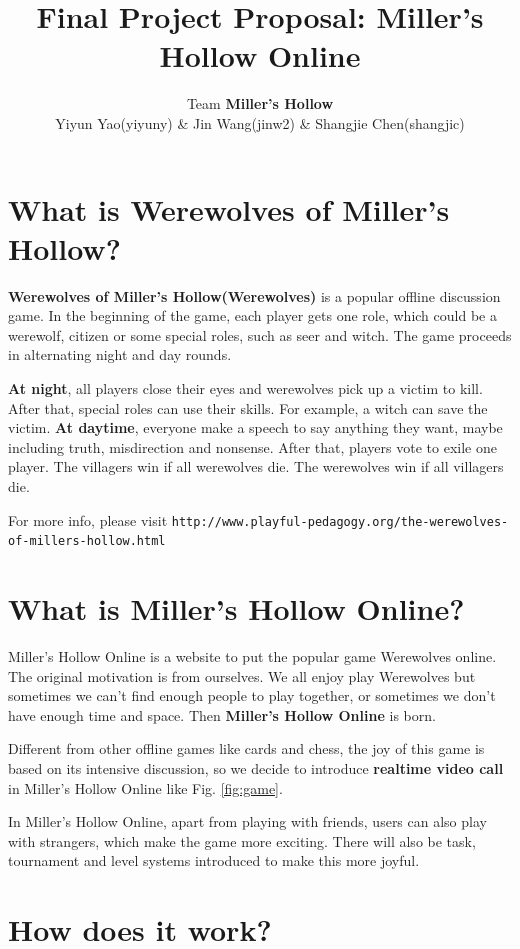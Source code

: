 \documentclass[11pt]{article}
\title{Final Project Proposal: Miller's Hollow Online}
\author{Team \textbf{Miller's Hollow}
\\Yiyun Yao(yiyuny) \& Jin Wang(jinw2) \& Shangjie Chen(shangjic)}
\date{}                                           %
\begin{document}
\maketitle
\section{What is Werewolves of Miller's Hollow?}
\textbf{Werewolves of Miller's Hollow(Werewolves)} is a popular offline discussion game. In the beginning of the game, each player gets one role, which could be a werewolf, citizen or some special roles, such as seer and witch. The game proceeds in alternating night and day rounds.

\textbf{At night}, all players close their eyes and werewolves pick up a victim to kill. After that, special roles can use their skills. For example, a witch can save the victim. \textbf{At daytime}, everyone make a speech to say anything they want, maybe including truth, misdirection and nonsense. After that, players vote to exile one player. The villagers win if all werewolves die. The werewolves win if all villagers die.

For more info, please visit \verb|http://www.playful-pedagogy.org/the-werewolves-of-millers-hollow.html|

\section{What is Miller's Hollow Online?}
Miller's Hollow Online is a website to put the popular game Werewolves online. The original motivation is from ourselves. We all enjoy play Werewolves but sometimes we can't find enough people to play together, or sometimes we don't have enough time and space. Then \textbf{Miller's Hollow Online} is born.

Different from other offline games like cards and chess, the joy of this game is based on its intensive discussion, so we decide to introduce \textbf{realtime video call} in Miller's Hollow Online like Fig. \ref{fig:game}.

In Miller's Hollow Online, apart from playing with friends, users can also play with strangers, which make the game more exciting. There will also be task, tournament and level systems introduced to make this more joyful.

\section{How does it work?}
\end{document}
